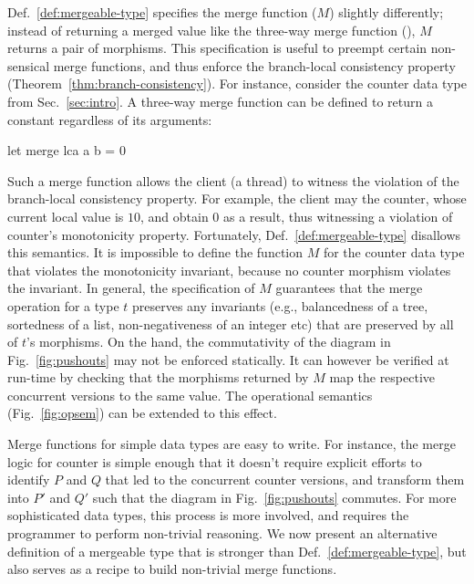 Def.~\ref{def:mergeable-type} specifies the merge function ($M$)
slightly differently; instead of returning a merged value like the
three-way merge function (), $M$ returns a pair of morphisms.
This specification is useful to preempt certain non-sensical merge
functions, and thus enforce the branch-local consistency property
(Theorem~\ref{thm:branch-consistency}). For instance, consider the
counter data type from Sec.~\ref{sec:intro}. A three-way merge
function can be defined to return a constant regardless of its
arguments:
\begin{ocaml}
  let merge lca a b = 0
\end{ocaml} Such a merge function allows the client (a thread) to
witness the violation of the branch-local consistency property. For
example, the client may  the counter, whose current local
value is $10$, and obtain $0$ as a result, thus witnessing a violation
of counter's monotonicity property. Fortunately,
Def.~\ref{def:mergeable-type} disallows this semantics. It is
impossible to define the function $M$ for the counter data type that
violates the monotonicity invariant, because no counter morphism
violates the invariant. In general, the specification of $M$
guarantees that the merge operation for a type $t$ preserves any
invariants (e.g., balancedness of a tree, sortedness of a list,
non-negativeness of an integer etc) that are preserved by all of $t$'s
morphisms. On the hand, the commutativity of the diagram in
Fig.~\ref{fig:pushouts} may not be enforced statically. It can however
be verified at run-time by checking that the morphisms returned by $M$
map the respective concurrent versions to the same value. The
operational semantics (Fig.~\ref{fig:opsem}) can be extended to this
effect.


Merge functions for simple data types are easy to write. For instance,
the merge logic for counter is simple enough that it doesn't require
explicit efforts to identify $P$ and $Q$ that led to the
concurrent counter versions, and transform them into $P'$ and $Q'$
such that the diagram in Fig.~\ref{fig:pushouts} commutes. For more
sophisticated data types, this process is more involved, and requires
the programmer to perform non-trivial reasoning. We now present an
alternative definition of a mergeable type that is stronger than
Def.~\ref{def:mergeable-type}, but also serves as a recipe to build
non-trivial merge functions.

